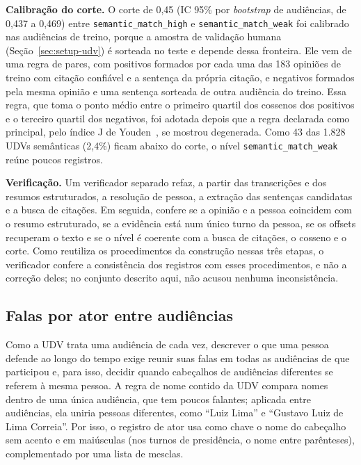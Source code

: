 \textbf{Calibração do corte.} O corte de 0,45 (IC 95\% por \textit{bootstrap} de audiências, de 0,437
a 0,469) entre \texttt{semantic\_match\_high} e \texttt{semantic\_match\_weak} foi calibrado nas
audiências de treino, porque a amostra de validação humana (Seção~\ref{sec:setup-udv}) é sorteada
no teste e depende dessa fronteira. Ele vem de uma regra de pares, com positivos formados por cada
uma das 183 opiniões de treino com citação confiável e a sentença da própria citação, e negativos
formados pela mesma opinião e uma sentença sorteada de outra audiência do treino. Essa regra, que toma
o ponto médio entre o primeiro quartil dos cossenos dos positivos e o terceiro quartil dos negativos,
foi adotada depois que a regra declarada como principal, pelo índice J de
Youden~\citep{youden1950index}, se mostrou degenerada. Como 43 das
1.828 UDVs semânticas (2,4\%) ficam abaixo do corte, o nível \texttt{semantic\_match\_weak} reúne
poucos registros.

\textbf{Verificação.} Um verificador separado refaz, a partir das transcrições e dos resumos
estruturados, a resolução de pessoa, a extração das sentenças candidatas e a busca de citações.
Em seguida, confere se a opinião e a pessoa coincidem com o resumo estruturado, se a evidência está
num único turno da pessoa, se os offsets recuperam o texto e se o nível é coerente com a busca de
citações, o cosseno e o corte. Como reutiliza os procedimentos da construção nessas três etapas, o
verificador confere a consistência dos registros com esses procedimentos, e não a correção deles; no
conjunto descrito aqui, não acusou nenhuma inconsistência.

\subsection{Falas por ator entre audiências}
\label{sec:metodo-atores}

Como a UDV trata uma audiência de cada vez, descrever o que uma pessoa defende ao longo do tempo
exige reunir suas falas em todas as audiências de que participou e, para isso, decidir quando
cabeçalhos de audiências diferentes se referem à mesma pessoa. A regra de nome contido da UDV compara
nomes dentro de uma única audiência, que tem poucos falantes; aplicada entre audiências, ela uniria
pessoas diferentes, como ``Luiz Lima'' e ``Gustavo Luiz de Lima Correia''. Por isso, o registro de
ator usa como chave o nome do cabeçalho sem acento e em maiúsculas (nos turnos de presidência, o nome
entre parênteses), complementado por uma lista de mesclas.

